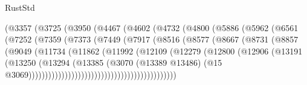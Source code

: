 \begin{lexlean}{RustStd}
\begin{coremodule}
                          (@3357
                            (@3725
                              (@3950
                                (@4467
                                  (@4602
                                    (@4732
                                      (@4800
                                        (@5886
                                          (@5962
                                            (@6561
                                              (@7252
                                                (@7359
                                                  (@7373
                                                    (@7449
                                                      (@7917
                                                        (@8516
                                                          (@8577
                                                            (@8667
                                                              (@8731
                                                                (@8857
                                                                  (@9049
                                                                    (@11734
                                                                      (@11862
                                                                        (@11992
                                                                          (@12109
                                                                            (@12279
                                                                              (@12800
                                                                                (@12906
                                                                                  (@13191
                                                                                    (@13250
                                                                                      (@13294
                                                                                        (@13385
                                                                                          (@3070
                                                                                            (@13389
                                                                                              @13486)
                                                                                            (@15
                                                                                              @3069)))))))))))))))))))))))))))))))))))))))))))))

\end{coremodule}
\end{lexlean}
